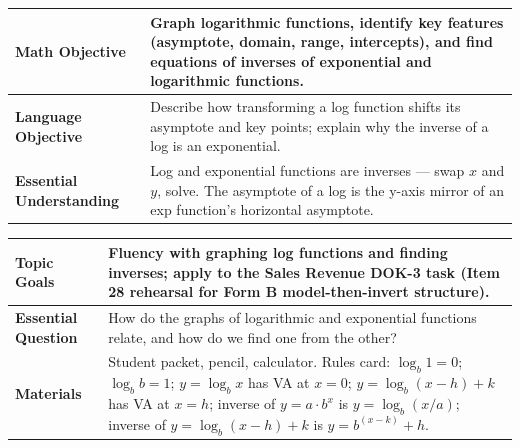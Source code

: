\documentclass[11pt]{article}
\begin{document}

{\small
\renewcommand{\arraystretch}{1.25}
\noindent\begin{tabular}{|p{1.8in}|p{4.8in}|}
\hline
\textbf{Math Objective} & Graph logarithmic functions, identify key features (asymptote, domain, range, intercepts), and find equations of inverses of exponential and logarithmic functions. \\ \hline
\textbf{Language Objective} & Describe how transforming a log function shifts its asymptote and key points; explain why the inverse of a log is an exponential. \\ \hline
\textbf{Essential Understanding} & Log and exponential functions are inverses --- swap \(x\) and \(y\), solve. The asymptote of a log is the y-axis mirror of an exp function's horizontal asymptote. \\ \hline
\end{tabular}
}

{\small
\renewcommand{\arraystretch}{1.25}
\noindent\begin{tabular}{|p{1.8in}|p{4.8in}|}
\hline
\textbf{Topic Goals} & Fluency with graphing log functions and finding inverses; apply to the Sales Revenue DOK-3 task (Item 28 rehearsal for Form B model-then-invert structure). \\ \hline
\textbf{Essential Question} & How do the graphs of logarithmic and exponential functions relate, and how do we find one from the other? \\ \hline
\textbf{Materials} & Student packet, pencil, calculator. Rules card: \(\log_b 1 = 0\); \(\log_b b = 1\); \(y = \log_b x\) has VA at \(x = 0\); \(y = \log_b(x - h) + k\) has VA at \(x = h\); inverse of \(y = a \cdot b^x\) is \(y = \log_b(x/a)\); inverse of \(y = \log_b(x - h) + k\) is \(y = b^{(x-k)} + h\). \\ \hline
\end{tabular}
}
\end{document}
